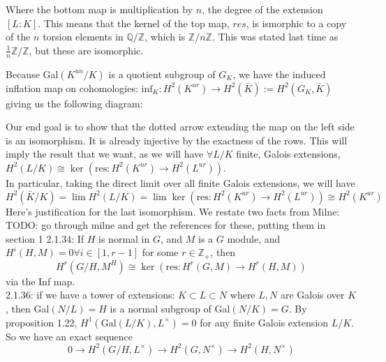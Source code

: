 \documentclass[class=article, crop=false]{standalone}
\begin{document}
Where the bottom map is multiplication by $n$, 
the degree of the extension $[L:K]$. 
This means that the kernel of the top map, 
$res$, is ismorphic to a copy of the $n$ torsion elements in 
$\mathbb{Q}/\mathbb{Z}$, which is $\mathbb{Z}/n\mathbb{Z}$. 
This was stated last time as 
$\frac{1}{n}\mathbb{Z}/\mathbb{Z}$, but these are isomorphic. 

Because Gal$(K^{un}/K)$ is a quotient subgroup of $G_K$, we have the induced inflation map on cohomologies: $\text{inf}_K:H^2(K^{ur})\rightarrow H^2(\bar{K}):=H^2(G_K,\bar{K})$ giving us the following diagram: 

\begin{center}
\end{center}


Our end goal is to show that the dotted arrow extending 
the map on the left side is an isomorphism. 
It is already injective by the exactness of the
rows.
This will imply the result that we want, as we will have 
$\forall L/K$ finite, Galois extensions, $H^2(L/K)\cong \ker(\text{res}: H^2(K^{ur})\rightarrow H^2(L^{ur}))$.\\

In particular, taking the direct limit over all finite Galois extensions, 
we will have 
$$H^2(\bar{K}/K)=\lim H^2(L/K)=\lim 
\ker(\text{res}: H^2(K^{ur})\rightarrow H^2(L^{ur})) \cong H^2(K^{ur})$$ 
Here's justification for the last isomorphism. 
We restate two facts from Milne: \\

{\color{red} TODO: go through milne and get the 
references for these, putting them in section 1}
2.1.34: If $H$ is normal in $G$, and $M$ is a $G$ module, and $H^i(H, M)=0 \forall i\in [1, r-1]$ for some $r\in\mathbb{Z}_+$, then
$$H^r(G/H, M^H)\cong \ker(\text{res}:H^r(G,M)\rightarrow H^r(H,M))$$ via the Inf map. \\
2.1.36: if we have a tower of extensions: $K\subset L\subset N$ where $L, N$ are Galois over $K$, then Gal$(N/L)=H$ is a normal subgroup of Gal$(N/K)=G$. By proposition 1.22, $H^1(\text{Gal}(L/K), L^\times)=0$ for any finite Galois extension $L/K$. So we have an exact sequence
$$0\rightarrow H^2(G/H, L^\times)\rightarrow H^2(G, N^\times)\rightarrow H^2(H, N^\times)$$
\end{document}
